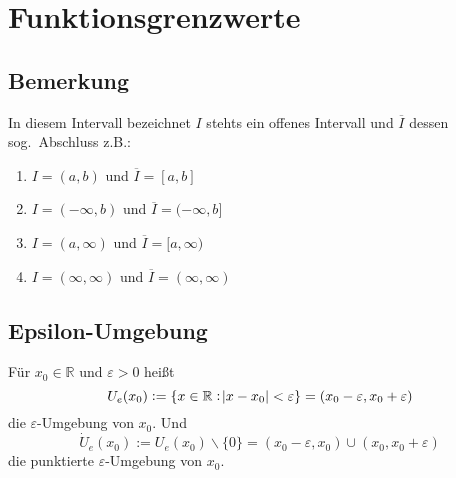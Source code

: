 \documentclass[10pt]{article}
\newcommand{\R}{\mathbb{R}}
\begin{document}
    \section{Funktionsgrenzwerte}

    \subsection{Bemerkung}
    In diesem Intervall bezeichnet $I$ stehts ein offenes Intervall und
    $\overline{I}$ dessen sog.\ Abschluss z.B.:
    \begin{enumerate}[label= (\alph*)]
        \item $I = (a, b)$ und $\overline{I} = [a, b]$
        \item $I = (-\infty, b)$ und $\overline{I} = (-\infty, b]$
        \item $I = (a, \infty)$ und $\overline{I} = [a, \infty)$
        \item $I = (\infty, \infty)$ und $\overline{I} = (\infty, \infty)$
    \end{enumerate}

    \subsection{Epsilon-Umgebung}
    Für $x_0 \in \R$ und $\varepsilon > 0$ heißt
    \begin{equation*}
        U_e(x_0) := \{ x \in \R: \abs{x - x_0}<\varepsilon \} =
        (x_0 - \varepsilon, x_0+\varepsilon)
    \end{equation*}
    die $\varepsilon$-Umgebung von $x_0$. Und
    \begin{equation*}
        \dot{U}_e(x_0) := U_e(x_0)\backslash \{0\} =
        (x_0-\varepsilon, x_0) \cup (x_0, x_0+\varepsilon)
    \end{equation*}
    die punktierte $\varepsilon$-Umgebung von $x_0$.
\end{document}
